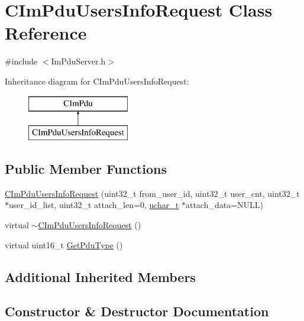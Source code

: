 \hypertarget{class_c_im_pdu_users_info_request}{}\section{C\+Im\+Pdu\+Users\+Info\+Request Class Reference}
\label{class_c_im_pdu_users_info_request}


{\ttfamily \#include $<$Im\+Pdu\+Server.\+h$>$}

Inheritance diagram for C\+Im\+Pdu\+Users\+Info\+Request\+:\begin{figure}[H]
\begin{center}
\leavevmode
\includegraphics[height=2.000000cm]{class_c_im_pdu_users_info_request}
\end{center}
\end{figure}
\subsection*{Public Member Functions}
\begin{DoxyCompactItemize}
\item 
\hyperlink{class_c_im_pdu_users_info_request_a6fd74bbdbae06089043a51a94f4e359c}{C\+Im\+Pdu\+Users\+Info\+Request} (uint32\+\_\+t from\+\_\+user\+\_\+id, uint32\+\_\+t user\+\_\+cnt, uint32\+\_\+t $\ast$user\+\_\+id\+\_\+list, uint32\+\_\+t attach\+\_\+len=0, \hyperlink{base_2ostype_8h_a124ea0f8f4a23a0a286b5582137f0b8d}{uchar\+\_\+t} $\ast$attach\+\_\+data=N\+U\+L\+L)
\item 
virtual \hyperlink{class_c_im_pdu_users_info_request_a7e050088cbd31ae5e069eb7154714482}{$\sim$\+C\+Im\+Pdu\+Users\+Info\+Request} ()
\item 
virtual uint16\+\_\+t \hyperlink{class_c_im_pdu_users_info_request_aeaa81d460dfa95a55d0dd416ae1c6ab0}{Get\+Pdu\+Type} ()
\end{DoxyCompactItemize}
\subsection*{Additional Inherited Members}


\subsection{Constructor \& Destructor Documentation}
\hypertarget{class_c_im_pdu_users_info_request_a6fd74bbdbae06089043a51a94f4e359c}{}
